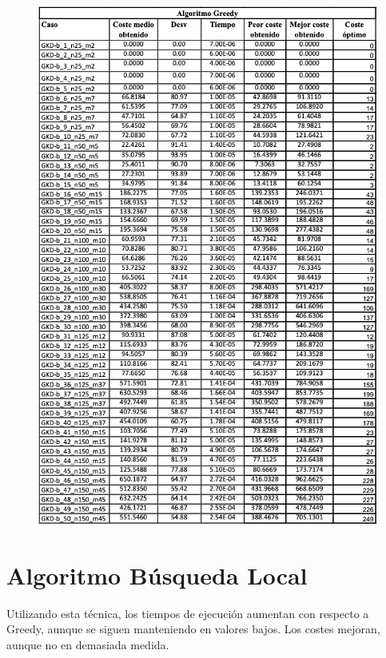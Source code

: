 \begin{figure}[H] %
    \centering
        \includegraphics[scale=0.65]{img/greedy.png}
\end{figure}

\newpage

\section{Algoritmo Búsqueda Local}
Utilizando esta técnica, los tiempos de ejecución aumentan con respecto a Greedy, aunque se siguen manteniendo en valores bajos. Los costes mejoran, aunque no en demasiada medida.

